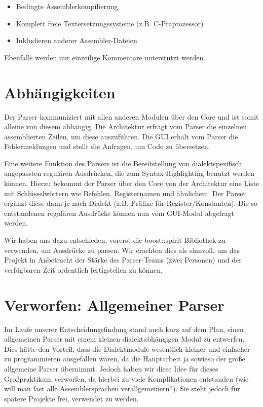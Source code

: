 \begin{itemize}
\item Bedingte Assemblerkompilierung
\item Komplett freie Textersetzungssysteme (z.B. C-Präprozessor)
\item Inkludieren anderer Assembler-Dateien
\end{itemize} Ebenfalls werden nur einzeilige Kommentare unterstützt werden.

\section{Abhängigkeiten} Der Parser kommuniziert mit allen anderen Modulen
über den Core und ist somit alleine von diesem abhängig.  Die Architektur
erfragt vom Parser die einzelnen assemblierten Zeilen, um diese auszuführen.
Die GUI erhält vom Parser die Fehlermeldungen und stellt die Anfragen, um Code
zu übersetzen.

Eine weitere Funktion des Parsers ist die Bereitstellung von dialektspezifisch
angepassten regulären Ausdrücken, die zum Syntax-Highlighting benutzt werden
können.  Hierzu bekommt der Parser über den Core von der Architektur eine Liste
mit Schlüsselwörtern wie Befehlen, Registernamen und ähnlichem. Der Parser
ergänzt diese dann je nach Dialekt (z.B. Präfixe für Register/Konstanten).  Die
so entstandenen regulären Ausdrücke können nun vom GUI-Modul abgefragt werden.

Wir haben uns dazu entschieden, vorerst die boost::spirit-Bibliothek zu
verwenden, um Ausdrücke zu parsen.  Wir erachten dies als sinnvoll, um das
Projekt in Anbetracht der Stärke des Parser-Teams (zwei Personen) und der
verfügbaren Zeit ordentlich fertigstellen zu können.

\section{Verworfen: Allgemeiner Parser} Im Laufe unserer Entscheidungsfindung
stand auch kurz auf dem Plan, einen allgemeinen Parser mit einem kleinen
dialektabhängigen Modul zu entwerfen.  Dies hätte den Vorteil, dass die
Dialektmodule wesentlich kleiner und einfacher zu programmieren ausgefallen
wären, da die Hauptarbeit ja sowieso der große allgemeine Parser übernimmt.
Jedoch haben wir diese Idee für dieses Großpraktikum verworfen, da hierbei zu
viele Komplikationen entstanden (wie will man fast alle Assemblersprachen
verallgemeinern?).  Sie steht jedoch für spätere Projekte frei, verwendet zu
werden.